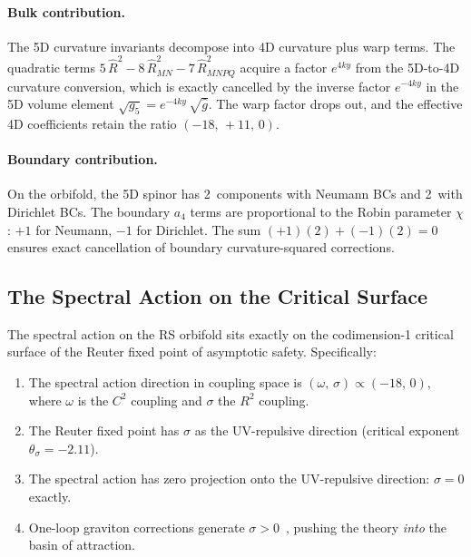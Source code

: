 \paragraph{Bulk contribution.} The 5D curvature invariants decompose into 4D curvature plus warp terms. The quadratic terms $5\, \hat{R}^2 - 8\, \hat{R}_{MN}^2 - 7\, \hat{R}_{MNPQ}^2$ acquire a factor $e^{4ky}$ from the 5D-to-4D curvature conversion, which is exactly cancelled by the inverse factor $e^{-4ky}$ in the 5D volume element $\sqrt{g_5} = e^{-4ky}\, \sqrt{\hat{g}}$. The warp factor drops out, and the effective 4D coefficients retain the ratio $(-18,\, +11,\, 0)$.

\paragraph{Boundary contribution.} On the orbifold, the 5D spinor has 2~components with Neumann BCs and 2~with Dirichlet BCs. The boundary $a_4$ terms are proportional to the Robin parameter $\chi$: $+1$ for Neumann, $-1$ for Dirichlet. The sum $(+1)(2) + (-1)(2) = 0$ ensures exact cancellation of boundary curvature-squared corrections.

\subsection{The Spectral Action on the Critical Surface}
\label{sec:4-critical-surface}

\begin{theorem}\label{thm:4-critical}
The spectral action on the RS orbifold sits exactly on the codimension-1 critical surface of the Reuter fixed point of asymptotic safety. Specifically:
\begin{enumerate}
  \item[(i)] The spectral action direction in coupling space is $(\omega,\, \sigma) \propto (-18,\, 0)$, where $\omega$ is the $C^2$ coupling and $\sigma$ the $R^2$ coupling.
  \item[(ii)] The Reuter fixed point has $\sigma$ as the UV-repulsive direction (critical exponent $\theta_\sigma = -2.11$).
  \item[(iii)] The spectral action has zero projection onto the UV-repulsive direction: $\sigma = 0$ exactly.
  \item[(iv)] One-loop graviton corrections generate $\sigma > 0$~\cite{ch4:AvramidiBarvinsky1985,ch4:FradkinTseytlin1982}, pushing the theory \emph{into} the basin of attraction.
\end{enumerate}
\end{theorem}

